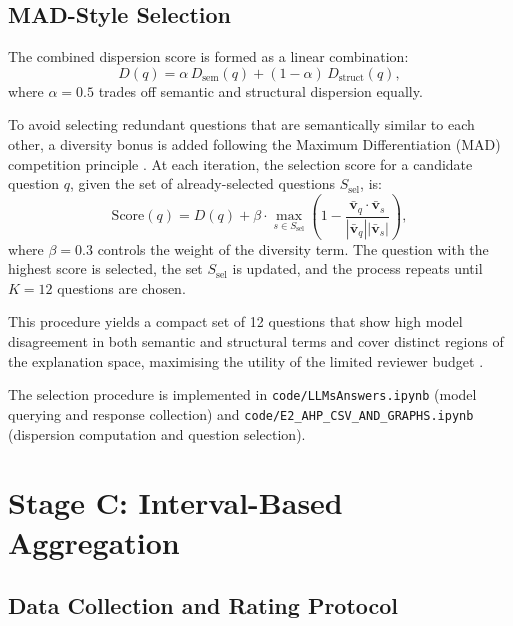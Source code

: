 \subsection{MAD-Style Selection}
\label{subsec:meth-mad}

The combined dispersion score is formed as a linear combination:
\begin{equation}
  D(q) = \alpha \, D_{\mathrm{sem}}(q) + (1-\alpha)\, D_{\mathrm{struct}}(q),
  \label{eq:combined}
\end{equation}
where $\alpha = 0.5$ trades off semantic and structural dispersion equally.

To avoid selecting redundant questions that are semantically similar to each other,
a diversity bonus is added following the Maximum Differentiation (MAD) competition
principle \citep{wang2008mad, feng2025sample}. At each iteration, the selection score
for a candidate question $q$, given the set of already-selected questions $S_{\mathrm{sel}}$,
is:
\begin{equation}
  \mathrm{Score}(q) = D(q) + \beta \cdot
    \max_{s \in S_{\mathrm{sel}}}\left(1 - \frac{\bar{\mathbf{v}}_{q}\cdot\bar{\mathbf{v}}_{s}}
                                               {|\bar{\mathbf{v}}_{q}||\bar{\mathbf{v}}_{s}|}\right),
  \label{eq:madscore}
\end{equation}
where $\beta = 0.3$ controls the weight of the diversity term. The question with the
highest score is selected, the set $S_{\mathrm{sel}}$ is updated, and the process
repeats until $K = 12$ questions are chosen.

This procedure yields a compact set of 12 questions that show high model disagreement
in both semantic and structural terms and cover distinct regions of the explanation
space, maximising the utility of the limited reviewer budget \citep{feng2025sample}.

The selection procedure is implemented in
\texttt{code/LLMsAnswers.ipynb} (model querying and response collection) and
\texttt{code/E2\_AHP\_CSV\_AND\_GRAPHS.ipynb} (dispersion computation and question
selection).

\section{Stage C: Interval-Based Aggregation}
\label{sec:meth-aggregation}

\subsection{Data Collection and Rating Protocol}
\label{subsec:meth-collection}


